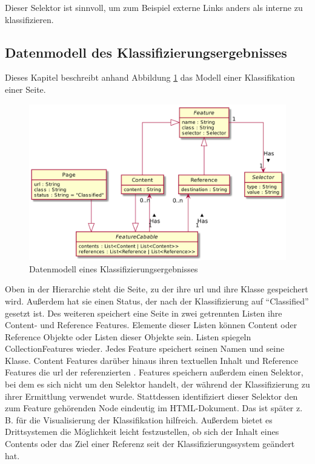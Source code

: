         Dieser Selektor ist sinnvoll, um zum Beispiel externe Links anders als interne zu klassifizieren.

    \subsection{Datenmodell des Klassifizierungsergebnisses}
        \label{section:conceptPageDataModel}
        Dieses Kapitel beschreibt anhand Abbildung \ref{image:conceptPageDataModel}
        das Modell einer Klassifikation einer Seite.

        \begin{figure}[htb]
            \centering
            \includegraphics[scale=\imageScalingFactor]{../resources/concept/page.png}
            \caption{Datenmodell eines Klassifizierungsergebnisses}
            \label{image:conceptPageDataModel}
        \end{figure}

        Oben in der Hierarchie steht die Seite,
        zu der ihre \gls{url} und ihre Klasse gespeichert wird.
        Außerdem hat sie einen Status, der nach der Klassifizierung auf
        "`Classified"' gesetzt ist.
        Des weiteren speichert eine Seite in zwei getrennten Listen ihre
        Content- und Reference Features.
        Elemente dieser Listen können Content oder Reference Objekte oder Listen
        dieser Objekte sein. Listen spiegeln CollectionFeatures wieder.
        Jedes Feature speichert seinen Namen und seine Klasse.
        Content Features darüber hinaus ihren textuellen Inhalt %
        und Reference Features die \gls{url} der referenzierten {\resource}.
        Features speichern außerdem einen Selektor, bei dem es sich nicht um den Selektor
        handelt, der während der Klassifizierung zu ihrer Ermittlung verwendet wurde.
        Stattdessen identifiziert dieser Selektor den zum Feature gehörenden Node eindeutig im HTML-Dokument.
        Das ist später z. B. für die Visualisierung der Klassifikation hilfreich.
        Außerdem bietet es Drittsystemen die Möglichkeit leicht festzustellen,
        ob sich der Inhalt eines Contents oder das Ziel einer Referenz seit der Klassifizierungssystem
        geändert hat.
